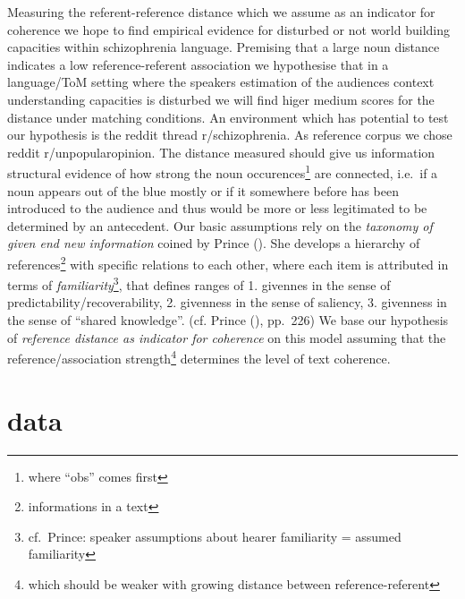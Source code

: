 \documentclass[
  12pt,
  oneside]{book}
\begin{document}
Measuring the referent-reference distance which we assume as an indicator for coherence we hope to find empirical evidence for disturbed or not world building capacities within schizophrenia language. Premising that a large noun distance indicates a low reference-referent association we hypothesise that in a language/ToM setting where the speakers estimation of the audiences context understanding capacities is disturbed we will find higer medium scores for the distance under matching conditions. An environment which has potential to test our hypothesis is the reddit thread r/schizophrenia. As reference corpus we chose reddit r/unpopularopinion.
The distance measured should give us information structural evidence of how strong the noun occurences\footnote{where ``obs'' comes first} are connected, i.e.~if a noun appears out of the blue mostly or if it somewhere before has been introduced to the audience and thus would be more or less legitimated to be determined by an antecedent.
Our basic assumptions rely on the \emph{taxonomy of given end new information} coined by Prince (). She develops a hierarchy of references\footnote{informations in a text} with specific relations to each other, where each item is attributed in terms of \emph{familiarity}\footnote{cf.~Prince: speaker assumptions about hearer familiarity = assumed familiarity}, that defines ranges of 1. givennes in the sense of predictability/recoverability, 2. givenness in the sense of saliency, 3. givenness in the sense of ``shared knowledge''. (cf. Prince (), pp.~226) We base our hypothesis of \emph{reference distance as indicator for coherence} on this model assuming that the reference/association strength\footnote{which should be weaker with growing distance between reference-referent} determines the level of text coherence.

\section{data}\label{data}
\end{document}
